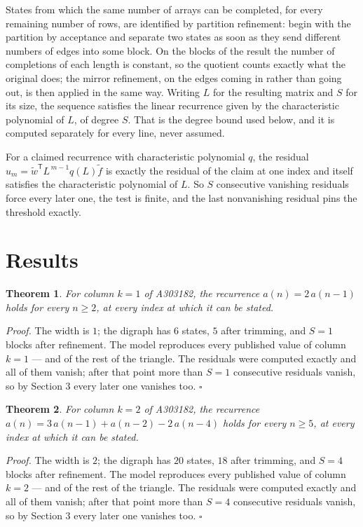 \documentclass[11pt]{article}
\newtheorem{theorem}{Theorem}
\theoremstyle{definition}
\begin{document}
States from which the same number of arrays can be completed, for every remaining number of rows, are identified by partition refinement: begin with the partition by acceptance and separate two states as soon as they send different numbers of edges into some block. On the blocks of the result the number of completions of each length is constant, so the quotient counts exactly what the original does; the mirror refinement, on the edges coming in rather than going out, is then applied in the same way. Writing $L$ for the resulting matrix and $S$ for its size, the sequence satisfies the linear recurrence given by the characteristic polynomial of $L$, of degree $S$. That is the degree bound used below, and it is computed separately for every line, never assumed.

For a claimed recurrence with characteristic polynomial $q$, the residual $u_m = \tilde w^{\mathsf T}L^{\,m-1}q(L)\tilde f$ is exactly the residual of the claim at one index and itself satisfies the characteristic polynomial of $L$. So $S$ consecutive vanishing residuals force every later one, the test is finite, and the last nonvanishing residual pins the threshold exactly.

\section{Results}

\begin{theorem} For column $k = 1$ of A303182, the recurrence $a(n) = 2\,a(n-1)$ holds for every $n \ge 2$, at every index at which it can be stated.\end{theorem}

{\itshape Proof.} The width is $1$; the digraph has $6$ states, $5$ after trimming, and $S = 1$ blocks after refinement. The model reproduces every published value of column $k = 1$ --- and of the rest of the triangle. The residuals were computed exactly and all of them vanish; after that point more than $S = 1$ consecutive residuals vanish, so by Section 3 every later one vanishes too. $\square$

\begin{theorem} For column $k = 2$ of A303182, the recurrence $a(n) = 3\,a(n-1) + a(n-2) - 2\,a(n-4)$ holds for every $n \ge 5$, at every index at which it can be stated.\end{theorem}

{\itshape Proof.} The width is $2$; the digraph has $20$ states, $18$ after trimming, and $S = 4$ blocks after refinement. The model reproduces every published value of column $k = 2$ --- and of the rest of the triangle. The residuals were computed exactly and all of them vanish; after that point more than $S = 4$ consecutive residuals vanish, so by Section 3 every later one vanishes too. $\square$
\end{document}

